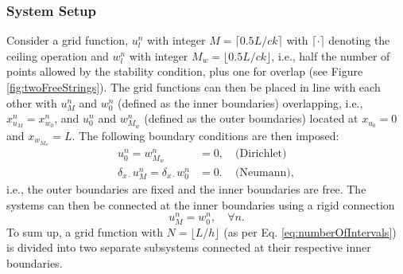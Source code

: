 \subsubsection{System Setup}\label{sec:systSetup}
Consider a grid function, $u_l^n$ with integer $M = \lceil 0.5L/ck\rceil $ with $\lceil \cdot \rceil$ denoting the ceiling operation and $w_l^n$ with integer $M_w = \lfloor 0.5L/ck\rfloor$, i.e., half the number of points allowed by the stability condition, plus one for overlap (see Figure \ref{fig:twoFreeStrings}). The grid functions can then be placed in line with each other with $u_M^n$ and $w_0^n$ (defined as the inner boundaries) overlapping, i.e., $x_{u_M}^n = x_{w_0}^n$, and $u_0^n$ and $w_{M_w}^n$ (defined as the outer boundaries) located at $x_{u_0} = 0$ and $x_{w_{M_w}} = L$. The following boundary conditions are then imposed:
\begin{subequations}\label{eq:halfStringBoundaryCond}
    \begin{align}
        u_0^n = w_{M_w}^n &= 0,\quad \text{(Dirichlet)}\label{eq:halfStringBoundaryCondDirichlet}\\
        \delta_{x\cdot}u_M^n = \delta_{x\cdot}w_0^n &= 0.\, \quad\text{(Neumann)}, \label{eq:halfStringBoundaryCondNeumann}
    \end{align}
\end{subequations}
i.e., the outer boundaries are fixed and the inner boundaries are free.
%
%
The systems can then be connected at the inner boundaries using a rigid connection
\begin{equation}\label{eq:rigid}
    u_M^n = w_0^n,\quad \forall n.
\end{equation}
To sum up, a grid function with $N = \lfloor L/h\rfloor$ (as per Eq. \eqref{eq:numberOfIntervals}) is divided into two separate subsystems connected at their respective inner boundaries. 

